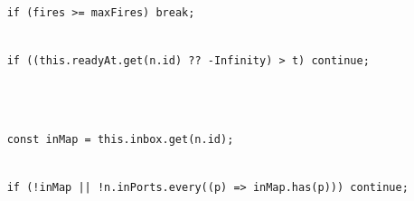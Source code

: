 \documentclass[
]{article}
\newcommand{\passthrough}[1]{#1}
\begin{document}
\passthrough{\lstinline!    !}\passthrough{\lstinline!if!}\passthrough{\lstinline! !}\passthrough{\lstinline!(!}\passthrough{\lstinline!fires!}\passthrough{\lstinline! !}\passthrough{\lstinline!>=!}\passthrough{\lstinline! !}\passthrough{\lstinline!maxFires!}\passthrough{\lstinline!)!}\passthrough{\lstinline! !}\passthrough{\lstinline!break!}\passthrough{\lstinline!;!}\strut \\
\passthrough{\lstinline!    !}\passthrough{\lstinline!if!}\passthrough{\lstinline! !}\passthrough{\lstinline!((!}\passthrough{\lstinline!this!}\passthrough{\lstinline!.!}\passthrough{\lstinline!readyAt!}\passthrough{\lstinline!.!}\passthrough{\lstinline!get!}\passthrough{\lstinline!(!}\passthrough{\lstinline!n!}\passthrough{\lstinline!.!}\passthrough{\lstinline!id!}\passthrough{\lstinline!)!}\passthrough{\lstinline! !}\passthrough{\lstinline!??!}\passthrough{\lstinline! !}\passthrough{\lstinline!-!}\passthrough{\lstinline!Infinity!}\passthrough{\lstinline!)!}\passthrough{\lstinline! !}\passthrough{\lstinline!>!}\passthrough{\lstinline! !}\passthrough{\lstinline!t!}\passthrough{\lstinline!)!}\passthrough{\lstinline! !}\passthrough{\lstinline!continue!}\passthrough{\lstinline!;!}\strut \\
\strut \\
\passthrough{\lstinline!    !}\passthrough{\lstinline!const!}\passthrough{\lstinline! !}\passthrough{\lstinline!inMap!}\passthrough{\lstinline! !}\passthrough{\lstinline!=!}\passthrough{\lstinline! !}\passthrough{\lstinline!this!}\passthrough{\lstinline!.!}\passthrough{\lstinline!inbox!}\passthrough{\lstinline!.!}\passthrough{\lstinline!get!}\passthrough{\lstinline!(!}\passthrough{\lstinline!n!}\passthrough{\lstinline!.!}\passthrough{\lstinline!id!}\passthrough{\lstinline!);!}\strut \\
\passthrough{\lstinline!    !}\passthrough{\lstinline!if!}\passthrough{\lstinline! !}\passthrough{\lstinline"(!"}\passthrough{\lstinline!inMap!}\passthrough{\lstinline! !}\passthrough{\lstinline!||!}\passthrough{\lstinline! !}\passthrough{\lstinline"!"}\passthrough{\lstinline!n!}\passthrough{\lstinline!.!}\passthrough{\lstinline!inPorts!}\passthrough{\lstinline!.!}\passthrough{\lstinline!every!}\passthrough{\lstinline!((!}\passthrough{\lstinline!p!}\passthrough{\lstinline!)!}\passthrough{\lstinline! !}\passthrough{\lstinline!=>!}\passthrough{\lstinline! !}\passthrough{\lstinline!inMap!}\passthrough{\lstinline!.!}\passthrough{\lstinline!has!}\passthrough{\lstinline!(!}\passthrough{\lstinline!p!}\passthrough{\lstinline!)))!}\passthrough{\lstinline! !}\passthrough{\lstinline!continue!}\passthrough{\lstinline!;!}\strut \\
\end{document}
